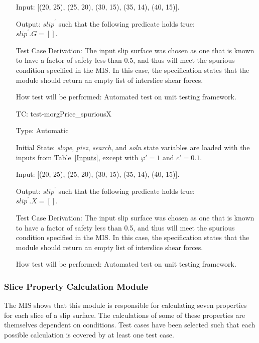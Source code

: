 \documentclass[12pt, titlepage]{article}
\newcounter{utestnum} %
\begin{document}
\begin{enumerate}[label=TC\arabic*:,ref={\arabic*}]
	Input: [(20, 25), (25, 20), (30, 15), (35, 14), (40, 15)].
	
	Output: $\textit{slip}^\prime$ such that the following predicate holds 
	true:\\ 
	$\textit{slip}^\prime.\textit{G} = []$.
	
	Test Case Derivation: The input slip surface was chosen as one that is 
	known to have a factor of safety less than 0.5, and thus will meet the 
	spurious condition specified in the MIS. In this case, the specification 
	states that the module should return an empty list of interslice shear 
	forces.
	
	How test will be performed: Automated test on unit testing framework.
	
	\item [TC\refstepcounter{utestnum}\theutestnum: 
	\label{TC_MorgPriceSpuriousX}] 
	test-morgPrice\_spuriousX
	
	Type: Automatic
	
	Initial State: \textit{slope}, \textit{piez}, \textit{search}, and 
	\textit{soln} state variables are loaded with the inputs from 
	Table~\ref{Inputs}, except with $\varphi' = 1$ and $c' = 0.1$.
	
	Input: [(20, 25), (25, 20), (30, 15), (35, 14), (40, 15)].
	
	Output: $\textit{slip}^\prime$ such that the following predicate holds 
	true:\\ 
	$\textit{slip}^\prime.\textit{X} = []$.
	
	Test Case Derivation: The input slip surface was chosen as one that is 
	known to have a factor of safety less than 0.5, and thus will meet the 
	spurious condition specified in the MIS. In this case, the specification 
	states that the module should return an empty list of interslice shear 
	forces.
	
	How test will be performed: Automated test on unit testing framework.
	
\end{enumerate}

\subsubsection{Slice Property Calculation Module}
The MIS shows that this module is responsible for calculating seven properties 
for each slice of a slip surface. The calculations of some of these properties 
are themselves dependent on conditions. Test cases have been selected such that 
each possible calculation is covered by at least one test case. 
\end{document}
